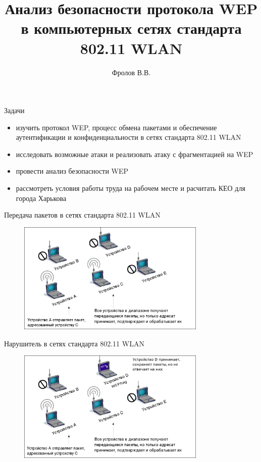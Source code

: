 \documentclass[12pt]{beamer}
\begin{document}
\title{Анализ безопасности протокола WEP в компьютерных сетях стандарта 802.11 WLAN}
\author{Фролов В.В.}
\date{}

\frame{\titlepage} 


\begin{frame}{Задачи}

    \begin{itemize}
        \item изучить протокол WEP, процесс обмена пакетами и обеспечение аутентификации и конфиденциальности в сетях стандарта 802.11 WLAN
        \item исследовать возможные атаки и реализовать атаку с фрагментацией на WEP
        \item провести анализ безопасности WEP
        \item рассмотреть условия работы труда на рабочем месте и расчитать КЕО для города Харькова
    \end{itemize}

\end{frame} 


\begin{frame}{Передача пакетов в сетях стандарта 802.11 WLAN}

    \begin{figure}
        \includegraphics[width=9cm]{graphics/wlan_diagram.eps}
    \end{figure}

\end{frame} 


\begin{frame}{Нарушитель в сетях стандарта 802.11 WLAN\newline}

    \begin{figure}
        \includegraphics[width=9cm]{graphics/wlan_diagram_with_attacker.eps}
    \end{figure}

\end{frame} 
\end{document}
